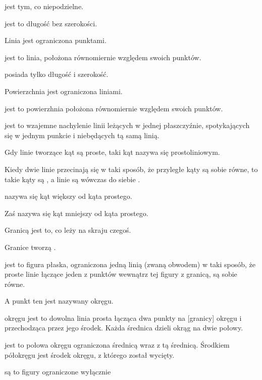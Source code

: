 \documentclass[12pt, a4paper]{scrartcl}
\begin{document}
\begin{definitions}
    \item {} jest tym, co niepodzielne.
    \item {} jest to długość bez szerokości.
    \item Linia jest ograniczona punktami.
    \item {} jest to linia, położona równomiernie względem swoich
        punktów.
    \item {} posiada tylko długość i szerokość.
    \item Powierzchnia jest ograniczona liniami.
    \item {} jest to powierzhnia położona równomiernie względem
        swoich punktów.
    \item {} jest to wzajemne nachylenie linii leżących w jednej
        płaszczyźnie, spotykających się w jednym punkcie i niebędących tą samą
        linią.
    \item Gdy linie tworzące kąt są proste, taki kąt nazywa się prostoliniowym.
    \item Kiedy dwie linie przecinają się w taki sposób, że przyległe kąty są
        sobie równe, to takie kąty są , a linie są wówczas
        do siebie .
    \item {} nazywa się kąt większy od kąta prostego.
    \item Zaś  nazywa się kąt mniejszy od kąta prostego.
    \item Granicą jest to, co leży na skraju czegoś.
    \item Granice tworzą .
    \item {} jest to figura płaska, ograniczona jedną linią (zwaną
        obwodem) w taki sposób, że proste linie łączące jeden z punktów wewnątrz
        tej figury z granicą, są sobie równe.
    \item A punkt ten jest nazywany  okręgu.
    \item {} okręgu jest to dowolna linia prosta łącząca dwa punkty
        na [granicy] okręgu i przechodząca przez jego środek. Każda średnica
        dzieli okrąg na dwie połowy.
    \item {} jest to połowa okręgu ograniczona średnicą wraz z tą
        średnicą. Środkiem półokręgu jest środek okręgu, z którego został
        wycięty.
    \item {} są to figury ograniczone wyłącznie

\end{definitions}
\end{document}
